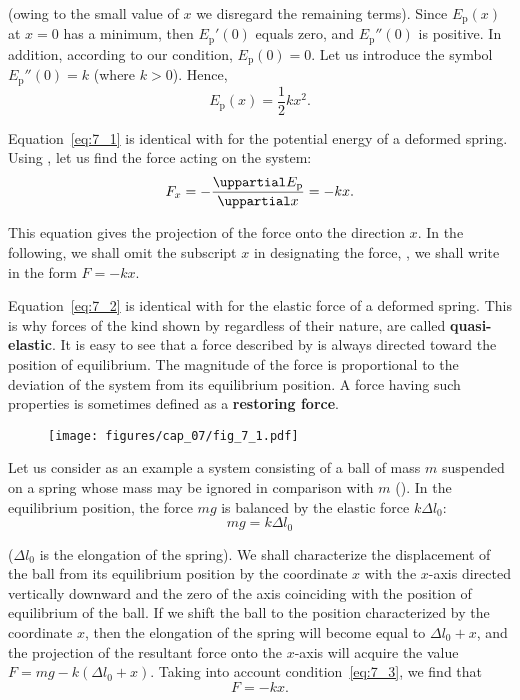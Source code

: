 \noindent
(owing to the small value of $x$ we disregard the remaining terms). Since $E_{\text{p}}(x)$ at $x=0$ has a minimum, then $E_{\text{p}}'(0)$ equals zero, and $E_{\text{p}}''(0)$ is positive. In addition, according to our condition, $E_{\text{p}}(0)=0$. Let us introduce the symbol $E_{\text{p}}''(0)=k$ (where $k>0$). Hence,
\begin{equation}\label{eq:7_1}
	E_{\text{p}}(x) = \frac{1}{2}kx^2.
\end{equation}

Equation~\eqref{eq:7_1} is identical with  for the potential energy of a deformed spring. Using , let us find the force acting on the system:
\begin{equation}\label{eq:7_2}
	F_x = -\diffpartial{E_{\text{p}}}{x} = -kx.
\end{equation}

This equation gives the projection of the force onto the direction $x$. In the following, we shall omit the subscript $x$ in designating the force, \ie, we shall write  in the form $F=-kx$.

Equation~\eqref{eq:7_2} is identical with  for the elastic force of a deformed spring. This is why forces of the kind shown by  regardless of their nature, are called \textbf{quasi-elastic}. It is easy to see that a force described by  is always directed toward the position of equilibrium. The magnitude of the force is proportional to the deviation of the system from its equilibrium position. A force having such properties is sometimes defined as a \textbf{restoring force}.

\begin{figure}[t]
	\begin{center}
		\texttt{[image: figures/cap\_07/fig\_7\_1.pdf]}
		\caption[]{}
		\label{fig:7_1}
	\end{center}
	\vspace{-0.7cm}
\end{figure}

Let us consider as an example a system consisting of a ball of mass $m$ suspended on a spring whose mass may be ignored in comparison with $m$ (). In the equilibrium position, the force $mg$ is balanced by the elastic force $k\Delta l_0$:
\begin{equation}\label{eq:7_3}
	mg = k\Delta l_0
\end{equation}

\noindent
($\Delta l_0$ is the elongation of the spring). We shall characterize the displacement of the ball from its equilibrium position by the coordinate $x$ with the $x$-axis directed vertically downward and the zero of the axis coinciding with the position of equilibrium of the ball. If we shift the ball to the position characterized by the coordinate $x$, then the elongation of the spring will become equal to $\Delta l_0+x$, and the projection of the resultant force onto the $x$-axis will acquire the value $F=mg-k(\Delta l_0+x)$. Taking into account condition~\eqref{eq:7_3}, we find that
\begin{equation}\label{eq:7_4}
	F = -kx.
\end{equation}

